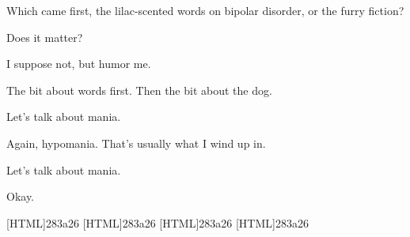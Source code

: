 \begin{paracol}{2}
\begin{leftcolumn}
\begin{ally}
Which came first, the lilac-scented words on bipolar disorder, or the furry fiction?
\end{ally}
Does it matter?

\begin{ally}
I suppose not, but humor me.
\end{ally}
The bit about words first. Then the bit about the dog.

\begin{ally}
Let's talk about mania.
\end{ally}
Again, hypomania. That's usually what I wind up in.

\begin{ally}
Let's talk about mania.
\end{ally}
Okay.

\newpage
\end{leftcolumn}
\end{paracol}

[HTML]{283a26}
[HTML]{283a26}
[HTML]{283a26}
[HTML]{283a26}

